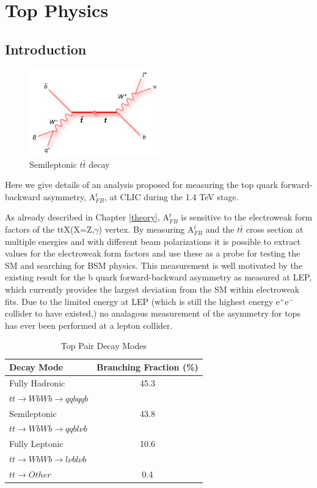 \chapter{Top Physics}
\label{chapter:topanalysis}
\section{Introduction}

\begin{figure}
  \centering
  \includegraphics[width=0.5\textwidth]{TopAnalysis/figures/TopFeynmann.jpg}
  \caption[Semileptonic $t\bar{t}$ decay]{Semileptonic $t\bar{t}$ decay}
  \label{fig:topfeynmann}
\end{figure}

Here we give details of an analysis proposed for measuring the top quark forward-backward asymmetry, A$_{FB}^t$, at CLIC during the 1.4 TeV stage. 

As already described in Chapter \ref{theory}, A$_{FB}^t$ is sensitive to the electroweak form factors of the ttX(X=Z,$\gamma$) vertex. By measuring A$_{FB}^t$ and the $t\bar{t}$ cross section at multiple energies and with different beam polarizations it is possible to extract values for the electroweak form factors and use these as a probe for testing the \ac{SM} and searching for \ac{BSM} physics. This measurement is well motivated by the existing result for the b quark forward-backward asymmetry as measured at \ac{LEP}, which currently provides the largest deviation from the \ac{SM} within electroweak fits. Due to the limited energy at \ac{LEP} (which is still the highest energy e$^+$e$^-$ collider to have existed,) no analagous measurement of the asymmetry for tops has ever been performed at a lepton collider. 

\begin{table}
  \centering
  \begin{tabular}{l |c}
    \toprule
    Decay Mode     & Branching Fraction (\%) \\
    \midrule
    Fully Hadronic & 45.3  \\
    $tt\rightarrow WbWb\rightarrow qqbqqb$ & \\
    \midrule
    Semileptonic & 43.8 \\
    $tt\rightarrow WbWb\rightarrow qqbl\nu b$ &  \\
    \midrule
    Fully Leptonic & 10.6 \\
    $tt\rightarrow WbWb\rightarrow l\nu bl\nu b$ &  \\
    \midrule
    $tt\rightarrow Other$ & 0.4 \\
    \bottomrule
  \end{tabular}
  \caption{Top Pair Decay Modes}
  \label{table:topdecaymodes}
\end{table}

